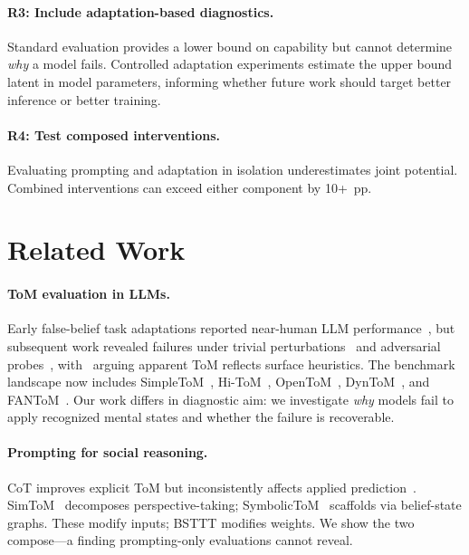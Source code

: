 \paragraph{R3: Include adaptation-based diagnostics.}
Standard evaluation provides a lower bound on capability but cannot determine \emph{why} a model fails.
Controlled adaptation experiments estimate the upper bound latent in model parameters, informing whether future work should target better inference or better training.

\paragraph{R4: Test composed interventions.}
Evaluating prompting and adaptation in isolation underestimates joint potential.
Combined interventions can exceed either component by 10+~pp.


\section{Related Work}
\label{sec:related}

\paragraph{ToM evaluation in LLMs.}
Early false-belief task adaptations reported near-human LLM performance~\citep{kosinski2024evaluating}, but subsequent work revealed failures under trivial perturbations~\citep{ullman2023large} and adversarial probes~\citep{shapira2024clever}, with~\citet{sap2022neural} arguing apparent ToM reflects surface heuristics.
The benchmark landscape now includes SimpleToM~\citep{gu2024simpletom}, Hi-ToM~\citep{wu-etal-2023-hi}, OpenToM~\citep{xu-etal-2024-opentom}, DynToM~\citep{xiao-etal-2025-towards}, and FANToM~\citep{kim-etal-2023-fantom}.
Our work differs in diagnostic aim: we investigate \emph{why} models fail to apply recognized mental states and whether the failure is recoverable.

\paragraph{Prompting for social reasoning.}
CoT improves explicit ToM but inconsistently affects applied prediction~\citep{moghaddam2023boosting}.
SimToM~\citep{wilf2024think} decomposes perspective-taking; SymbolicToM~\citep{sclar-etal-2023-minding} scaffolds via belief-state graphs.
These modify inputs; BSTTT modifies weights. We show the two compose---a finding prompting-only evaluations cannot reveal.


